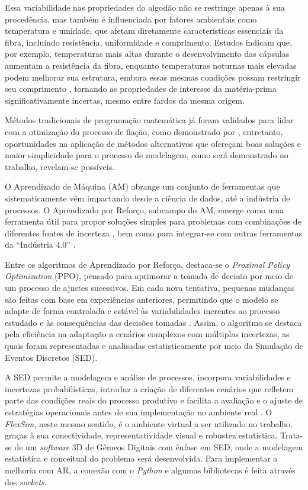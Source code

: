 \documentclass[
    12pt,                %
    openright,           %
    oneside,             %
    a4paper,             %
    english,             %
    spanish,             %
    brazil               %
]{ufscar}
\begin{document}
Essa variabilidade nas propriedades do algodão não se restringe apenas à sua procedência, mas também é influenciada por fatores ambientais como temperatura e umidade, que afetam diretamente características essenciais da fibra, incluindo resistência, uniformidade e comprimento. Estudos indicam que, por exemplo, temperaturas mais altas durante o desenvolvimento das cápsulas aumentam a resistência da fibra, enquanto temperaturas noturnas mais elevadas podem melhorar sua estrutura, embora essas mesmas condições possam restringir seu comprimento \cite{istipliler_impact_2024}, tornando as propriedades de interesse da matéria-prima significativamente incertas, mesmo entre fardos da mesma origem.

Métodos tradicionais de programação matemática já foram validados para lidar com a otimização do processo de fiação, como demonstrado por , entretanto, oportunidades na aplicação de métodos alternativos que ofereçam boas soluções e maior simplicidade para o processo de modelagem, como será demonstrado no trabalho, revelam-se possíveis. 

O Aprendizado de Máquina (AM) abrange um conjunto de ferramentas que sistematicamente vêm impactando desde a ciência de dados, até a indústria de processos. O Aprendizado por Reforço, subcampo do AM, emerge como uma ferramenta útil para propor soluções simples para problemas com combinações de diferentes fontes de incerteza \cite{sutton_reinforcement_2014}, bem como para integrar-se com outras ferramentas da ``Indústria 4.0” \cite{del_real_torres_review_2022}.

Entre os algoritmos de Aprendizado por Reforço, destaca-se o \textit{Proximal Policy Optimization} (PPO), pensado para aprimorar a tomada de decisão por meio de um processo de ajustes sucessivos. Em cada nova tentativa, pequenas mudanças são feitas com base em experiências anteriores, permitindo que o modelo se adapte de forma controlada e estável às variabilidades inerentes ao processo estudado e às consequências das decisões tomadas \cite{schulman_proximal_2017}. Assim, o algoritmo se destaca pela eficiência na adaptação a cenários complexos com múltiplas incertezas, as quais foram representadas e analisadas estatisticamente por meio da Simulação de Eventos Discretos (SED).

A SED permite a modelagem e análise de processos, incorpora variabilidades e incertezas probabilísticas, introduz a criação de diferentes cenários que refletem parte das condições reais do processo produtivo e facilita a avaliação e o ajuste de estratégias operacionais antes de sua implementação no ambiente real \cite{banks_discrete-event_2010}. O \textit{FlexSim}, neste mesmo sentido, é o ambiente virtual a ser utilizado no trabalho, graças à sua conectividade, representatividade visual e robustez estatística. Trata-se de um \textit{software} 3D de Gêmeos Digitais com ênfase em SED, onde a modelagem estatística e conceitual do problema será desenvolvida. Para implementar a melhoria com AR, a conexão com o \textit{Python} e algumas bibliotecas é feita através dos \textit{sockets}. 
\end{document}
